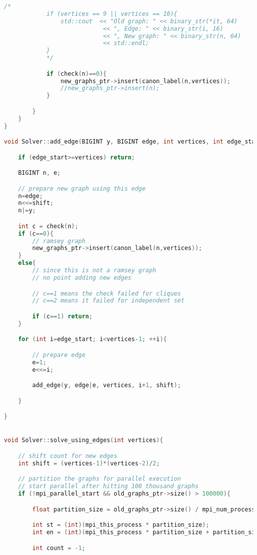 \documentclass[12pt]{etsu_thesis}
\begin{document}
\begin{lstlisting}[language=C++]
            /*
            if (vertices == 9 || vertices == 10){
                std::cout  << "Old graph: " << binary_str(*it, 64) 
                            << ", Edge: " << binary_str(i, 16)
                            << ", New graph: " << binary_str(n, 64) 
                            << std::endl;
            }
            */             

            if (check(n)==0){
                new_graphs_ptr->insert(canon_label(n,vertices));
                //new_graphs_ptr->insert(n);
            }

        }
    }
}

void Solver::add_edge(BIGINT y, BIGINT edge, int vertices, int edge_start, int shift){

    if (edge_start>=vertices) return;

    BIGINT n, e;

    // prepare new graph using this edge
    n=edge;
    n<<=shift;
    n|=y;

    int c = check(n);
    if (c==0){
        // ramsey graph
        new_graphs_ptr->insert(canon_label(n,vertices));
    }
    else{
        // since this is not a ramsey graph
        // no point adding new edges

        // c==1 means the check failed for cliques
        // c==2 means it failed for independent set

        if (c==1) return;
    }

    for (int i=edge_start; i<vertices-1; ++i){

        // prepare edge
        e=1;
        e<<=i;

        add_edge(y, edge|e, vertices, i+1, shift);

    }

}


void Solver::solve_using_edges(int vertices){

    // shift count for new edges
    int shift = (vertices-1)*(vertices-2)/2;

    // partition the graphs for parallel execution
    // start parallel after hitting 100 thousand graphs
    if (!mpi_parallel_start && old_graphs_ptr->size() > 100000){

        float partition_size = old_graphs_ptr->size() / mpi_num_processes;

        int st = (int)(mpi_this_process * partition_size);
        int en = (int)(mpi_this_process * partition_size + partition_size);

        int count = -1;


\end{lstlisting}
\end{document}
